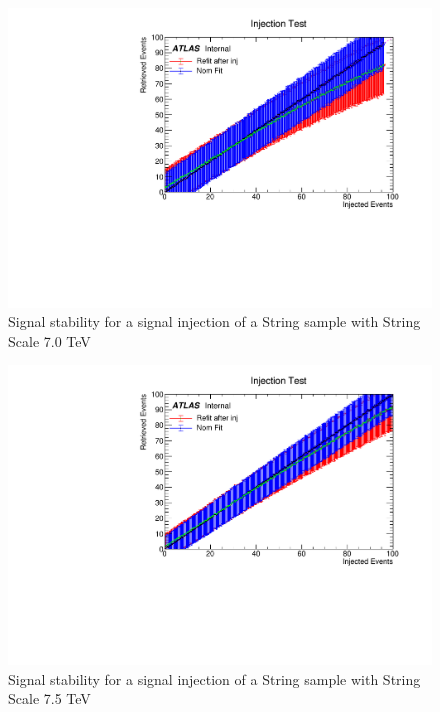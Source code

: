 \begin{figure}
    \centering
    \includegraphics[trim={0cm 0cm 1.6cm 1cm},clip,width=1.0\linewidth]{figures/app-GlobalFitStability/injectionFitStabilityStringScale7000.pdf}
    \caption{Signal stability for a signal injection of a String sample with String Scale 7.0 TeV}
    \label{fig:StringSignalInjectionFitStabilityStudyMs7.0TeV}
\end{figure}
\begin{figure}
    \centering
    \includegraphics[trim={0cm 0cm 1.6cm 1cm},clip,width=1.0\linewidth]{figures/app-GlobalFitStability/injectionFitStabilityStringScale7500.pdf}
    \caption{Signal stability for a signal injection of a String sample with String Scale 7.5 TeV}
    \label{fig:StringSignalInjectionFitStabilityStudyMs7.5TeV}
\end{figure}
